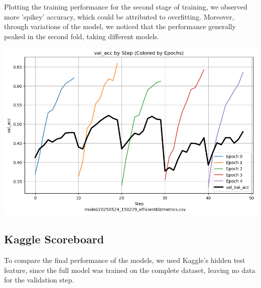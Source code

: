 \documentclass[10pt]{article}
\begin{document}
\begin{minipage}{0.55\linewidth}
Plotting the training performance for the second stage of training, we observed more 'spikey' accuracy, which could be attributed to overfitting. Moreover, through variations of the model, we noticed that the performance generally peaked in the second fold, taking different models.
\end{minipage}
\hfill
\begin{minipage}{0.35\linewidth}
  \includegraphics[width=\linewidth]{img/semisuper_learning_val_acc.png}
\end{minipage}

\subsection*{Kaggle Scoreboard}

To compare the final performance of the models, we used Kaggle's hidden test feature, since the full model was trained on the complete dataset, leaving no data for the validation step.
\end{document}
